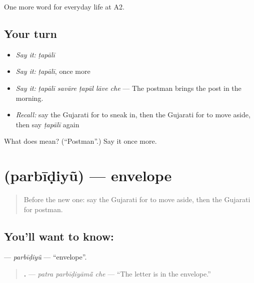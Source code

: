 \begin{grammarlens}[title={What you've built}]
One more word for everyday life at A2.
\end{grammarlens}

\subsection*{Your turn}
\begin{itemize}
\raggedright
  \item \emph{Say it:} \emph{ṭapālī}
  \item \emph{Say it:} \emph{ṭapālī}, once more
  \item \emph{Say it:} \emph{ṭapālī savāre ṭapāl lāve che} — The postman brings the post in the morning.
  \item \emph{Recall:} say the Gujarati for to sneak in, then the Gujarati for to move aside, then say \emph{ṭapālī} again
\end{itemize}

\begin{tcolorbox}[breakable,colback=teal!4,colframe=teal!35!black,title={Before you move on}]
What does  mean? (\textquotedblleft{}Postman\textquotedblright{}.) Say it once more.
\end{tcolorbox}
\section[\texorpdfstring{\gu{પરબીડિયું} (parbīḍiyũ)}{પરબીડિયું (parbīḍiyũ)}]{ (parbīḍiyũ) — envelope}

\label{lesson:GU-C200-parbidiyu}



\begin{quote}
Before the new one: say the Gujarati for to move aside, then the Gujarati for postman.
\end{quote}

\subsection*{You'll want to know: }
\textbf{} — \emph{parbīḍiyũ} — \textquotedblleft{}envelope\textquotedblright{}.

\begin{quote}
\textbf{  .} — \emph{patra parbīḍiyāmā̃ che} — \textquotedblleft{}The letter is in the envelope.\textquotedblright{}
\end{quote}

